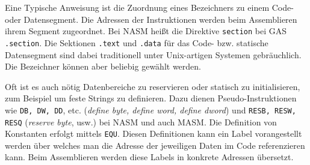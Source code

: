 Eine Typische Anweisung ist die Zuordnung eines Bezeichners zu einem Code- oder
Datensegment. Die Adressen der Instruktionen werden beim Assemblieren ihrem
Segment zugeordnet. Bei NASM heißt die Direktive \texttt{section}
bei GAS \texttt{.section}. Die Sektionen \texttt{.text} und
\texttt{.data} für das Code- bzw. statische Datensegment sind dabei traditionell
unter Unix-artigen Systemen gebräuchlich. Die Bezeichner können aber
beliebig gewählt werden.

Oft ist es auch nötig Datenbereiche zu reservieren oder statisch zu
initialisieren, zum Beispiel um feste Strings zu definieren. Dazu dienen
Pseudo-Instruktionen wie \texttt{DB, DW, DD}, etc. (\emph{define byte, define
word, define dword}) und \texttt{RESB, RESW, RESQ} (\emph{reserve byte}, usw.)
bei NASM und auch MASM. Die Definition von Konstanten erfolgt mittels
\texttt{EQU}. Diesen Definitionen kann ein Label vorangestellt werden über
welches man die Adresse der jeweiligen Daten im Code referenzieren kann. Beim
Assemblieren werden diese Labels in konkrete Adressen übersetzt.

